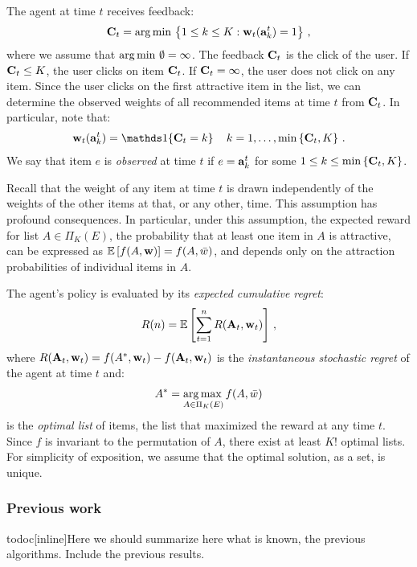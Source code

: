 The agent at time $t$ receives feedback:
\begin{align*}
  \mathbf{C}_t = \operatorname*{arg\,min\,} \left\{1 \leq k \leq K: \mathbf{w}_t(\mathbf{a}^t_k) = 1\right\}\,,
\end{align*}
where we assume that $\operatorname*{arg\,min\,} \emptyset = \infty$. The feedback $\mathbf{C}_t$ is the click of the user. If $\mathbf{C}_t \leq K$, the user clicks on item $\mathbf{C}_t$. If $\mathbf{C}_t = \infty$, the user does not click on any item. Since the user clicks on the first attractive item in the list, we can determine the observed weights of all recommended items at time $t$ from $\mathbf{C}_t$. In particular, note that:
\begin{align}
  \rnd{w}_t(\rnd{a}^t_k) = \I{\rnd{C}_t = k} \quad k = 1, \dots, \min \set{\rnd{C}_t, K}\,.
  \label{eq:click}
\end{align}
We say that item $e$ is \emph{observed} at time $t$ if $e = \mathbf{a}^t_k$ for some $1 \leq k \leq \min \left\{\mathbf{C}_t, K\right\}$.

Recall that the weight of any item at time $t$ is drawn independently of the weights of the other items at that, or any other, time. This assumption has profound consequences. In particular, under this assumption, the expected reward for list $A \in \Pi_K(E)$, the probability that at least one item in $A$ is attractive, can be expressed as $\mathbb{E} \left[f(A, \mathbf{w})\right] = f(A, \bar{w})$, and depends only on the attraction probabilities of individual items in $A$.

The agent's policy is evaluated by its \emph{expected cumulative regret}:
\begin{align*}
  R(n) = \mathbb{E} \left[\sum_{t = 1}^n R(\mathbf{A}_t, \mathbf{w}_t)\right]\,,
\end{align*}
where $R(\mathbf{A}_t, \mathbf{w}_t) = f(A^\ast, \mathbf{w}_t) - f(\mathbf{A}_t, \mathbf{w}_t)$ is the \emph{instantaneous stochastic regret} of the agent at time $t$ and:
\begin{align*}
  A^\ast = \operatorname*{arg\,max\,}_{A \in \Pi_K(E)} f(A, \bar{w})
\end{align*}
is the \emph{optimal list} of items, the list that maximized the reward at any time $t$. Since $f$ is invariant to the permutation of $A$, there exist at least $K!$ optimal lists. For simplicity of exposition, we assume that the optimal solution, as a set, is unique.

\subsubsection{Previous work}
todoc[inline]{Here we should summarize here what is known, the previous algorithms. Include the previous results.}

